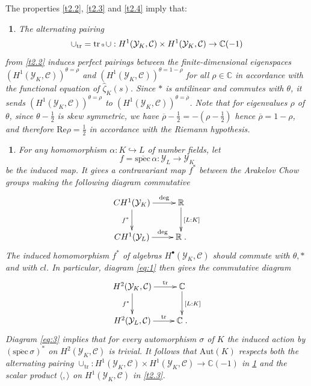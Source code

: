\documentclass[12pt,leqno]{article}
\newcommand{\C}{{\mathbb{C}}}
\newcommand{\R}{{\mathbb{R}}}
\newcommand{\spec}{\mathrm{spec}\,}
\newcommand{\tr}{\mathrm{tr}}
\newcommand{\Aut}{\mathrm{Aut}}
\newcommand{\RRe}{\mathrm{Re}}
\newcommand{\Ch}{{\mathcal C}}
\newcommand{\Yh}{\mathcal{Y}}
\newcommand{\orho}{\overline{\rho}}
\newcommand{\hzeta}{\hat{\zeta}}
\newcommand{\halb}{\frac{1}{2}}
\newtheorem{punkt}[theorem]{$\!\!$}
\newcommand{\verk}{\mbox{\scriptsize $\,\circ\,$}}
\begin{document}
The properties \ref{t2.2}, \ref{t2.3} and \ref{t2.4} imply that:
\begin{punkt} \label{t2.6} \em 
The alternating pairing 
\[
\cup_{\tr} = \tr \verk \cup : H^1 (\Yh_K , \Ch) \times H^1 (\Yh_K , \Ch) \to \C (-1)
\]
from \ref{t2.2} induces perfect pairings between the finite-dimensional eigenspaces \\
$(H^1 (\Yh_K , \Ch))^{\theta = \rho}$ and $(H^1 (\Yh_K , \Ch))^{\theta = 1-\rho}$ for all $\rho \in \C$ in accordance with the functional equation of $\hzeta_K (s)$. Since $*$ is antilinear and commutes with $\theta$, it sends $(H^1 (\Yh_K , \Ch))^{\theta = \rho}$ to $(H^1 (\Yh_K , \Ch))^{\theta = \overline{\rho}}$. Note that for eigenvalues $\rho$ of $\theta$, since $\theta - \halb$ is skew symmetric, we have $\orho - \halb = - (\rho - \halb)$ hence $\orho = 1 - \rho$, and therefore $\RRe \rho = \halb$ in accordance with the Riemann hypothesis. 
\end{punkt}
\begin{punkt} \label{t2.7} \em
For any homomorphism $\alpha : K \hookrightarrow L$ of number fields, let 
\[
f = \overline{\spec} \alpha : \Yh_L \to \Yh_K
\]
be the induced map. It gives a contravariant map $f^*$ between the Arakelov Chow groups making the following diagram commutative
\begin{equation}
\label{eq:2}
\vcenter{\xymatrix{
CH^1 (\Yh_K) \ar[d]_{f^{\ast}} \ar[r]^-{\deg} & \R \ar[d]^{[L : K]} \\
CH^1 (\Yh_L)\ar[r]^-{\deg} & \R  \; .
}}
\end{equation}
The induced homomorphism $f^*$ of algebras $H^{\bullet} (\Yh_K, \Ch)$ should commute with $\theta, *$ and with $cl$. In particular, diagram \eqref{eq:1} then gives the commutative diagram
\begin{equation}
\label{eq:3}
\vcenter{\xymatrix{
H^2 (\Yh_K , \Ch) \ar[r]^-{\tr} \ar[d]_{f^*} & \C \ar[d]^{[L : K]} \\
H^2 (\Yh_L,\Ch) \ar[r]^-{\tr} & \C \; .
}}
\end{equation}
Diagram \eqref{eq:3} implies that for every automorphism $\sigma$ of $K$ the induced action by $(\overline{\spec} \sigma)^*$ on $H^2 (\Yh_K , \Ch)$ is trivial. It follows that $\Aut (K)$ respects both the alternating pairing $\cup_{\tr} : H^1 (\Yh_K , \Ch) \times H^1 (\Yh_K , \Ch) \to \C (-1)$ in \ref{t2.6} and the scalar product $\langle , \rangle$ on $H^1 (\Yh_K , \Ch)$ in \ref{t2.3}. 
\end{punkt}
\end{document}

